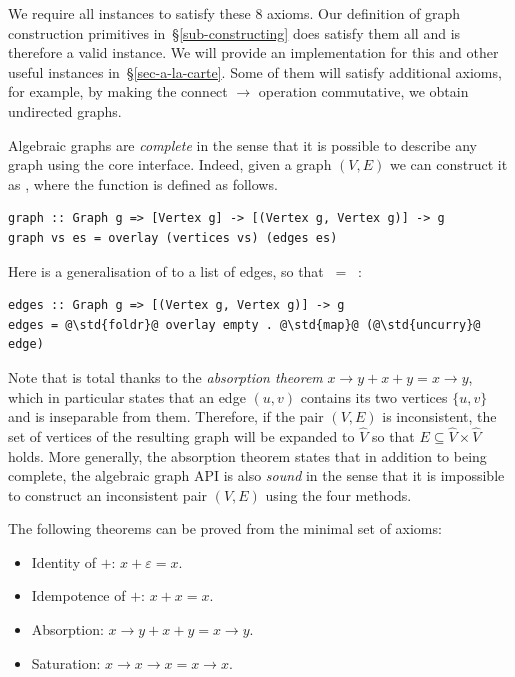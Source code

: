 We require all  instances to satisfy these 8 axioms. Our definition
of graph construction primitives in~\S\ref{sub-constructing} does satisfy them
all and is therefore a valid  instance. We will provide an
implementation for this and other useful instances in~\S\ref{sec-a-la-carte}.
Some of them will satisfy additional
axioms, for example, by making the connect $\rightarrow$ operation commutative,
we obtain undirected graphs.

Algebraic graphs are \emph{complete} in the sense that it is possible to describe
any graph using the core interface. Indeed, given a graph $(V,E)$ we can construct
it as , where the function  is defined as follows.

\begin{verbatim}
graph :: Graph g => [Vertex g] -> [(Vertex g, Vertex g)] -> g
graph vs es = overlay (vertices vs) (edges es)
\end{verbatim}

Here  is a generalisation of  to a list of edges, so that
 $\ =\ $ :

\begin{verbatim}
edges :: Graph g => [(Vertex g, Vertex g)] -> g
edges = @\std{foldr}@ overlay empty . @\std{map}@ (@\std{uncurry}@ edge)
\end{verbatim}

Note that  is total thanks to the \emph{absorption theorem}
$x \rightarrow y + x + y = x \rightarrow y$, which in particular states that
an edge $(u,v)$ contains its two vertices $\{u,v\}$ and is inseparable
from them. Therefore, if the pair $(V,E)$ is inconsistent, the set of vertices of
the resulting graph will be expanded to $\hat{V}$ so that
$E\subseteq \hat{V}\times \hat{V}$ holds. More generally, the absorption
theorem states that in addition to being complete, the algebraic graph
API is also \emph{sound} in the sense that it is impossible to construct
an inconsistent pair $(V,E)$ using the four  methods.

The following theorems can be proved from the minimal set of axioms:

\begin{itemize}
    \item Identity of $+$: $x + \varepsilon = x$.
    \item Idempotence of $+$: $x + x = x$.
    \item Absorption: $x \rightarrow y + x + y = x \rightarrow y$.
    \item Saturation: $x \rightarrow x \rightarrow x = x \rightarrow x$.
\end{itemize}


